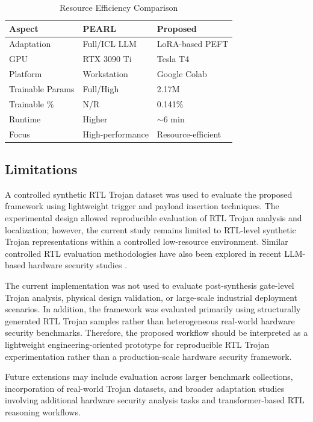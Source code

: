 \documentclass[conference]{IEEEtran}
\begin{document}
\begin{table}[!t]
\caption{Resource Efficiency Comparison}
\label{tab:resource_efficiency}
\centering
\begin{tabular}{lll}
\toprule
Aspect & PEARL & Proposed \\
\midrule
Adaptation & Full/ICL LLM & LoRA-based PEFT \\
GPU & RTX 3090 Ti & Tesla T4 \\
Platform & Workstation & Google Colab \\
Trainable Params & Full/High & 2.17M \\
Trainable \% & N/R & 0.141\% \\
Runtime & Higher & $\sim$6 min \\
Focus & High-performance & Resource-efficient \\
\bottomrule
\end{tabular}
\end{table}

\subsection{Limitations}
\label{subsec:limitations}

A controlled synthetic RTL Trojan dataset was used to evaluate the proposed framework using lightweight trigger and payload insertion techniques. The experimental design allowed reproducible evaluation of RTL Trojan analysis and localization; however, the current study remains limited to RTL-level synthetic Trojan representations within a controlled low-resource environment. Similar controlled RTL evaluation methodologies have also been explored in recent LLM-based hardware security studies \cite{kundu2025pearl}.

The current implementation was not used to evaluate post-synthesis gate-level Trojan analysis, physical design validation, or large-scale industrial deployment scenarios. In addition, the framework was evaluated primarily using structurally generated RTL Trojan samples rather than heterogeneous real-world hardware security benchmarks. Therefore, the proposed workflow should be interpreted as a lightweight engineering-oriented prototype for reproducible RTL Trojan experimentation rather than a production-scale hardware security framework.

Future extensions may include evaluation across larger benchmark collections, incorporation of real-world Trojan datasets, and broader adaptation studies involving additional hardware security analysis tasks and transformer-based RTL reasoning workflows.
\end{document}
